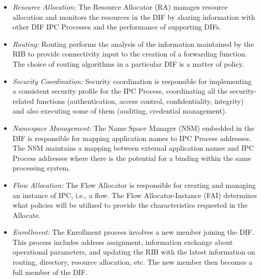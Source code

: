 \documentclass{ieeeaccess}
\begin{document}
\begin{itemize}
	\item \textit{Resource Allocation:} The Resource Allocator (RA) manages resource allocation and monitors the resources in the DIF by sharing information with other DIF IPC Processes and the performance of supporting DIFs.
	\item \textit{Routing:} Routing performs the analysis of the information maintained by the RIB to provide connectivity input to the creation of a forwarding function. The choice of routing algorithms in a particular DIF is a matter of policy.
	\item \textit{Security Coordination:} Security coordination is responsible for implementing a consistent security profile for the IPC Process, coordinating all the security-related functions (authentication, access control, confidentiality, integrity) and also executing some of them (auditing, credential management).
	\item \textit{Namespace Management:} The Name Space Manager (NSM) embedded in the DIF is responsible for mapping application names to IPC Process addresses. The NSM maintains a mapping between external application names and IPC Process addresses where there is the potential for a binding within the same processing system.
	\item \textit{Flow Allocation:} The Flow Allocator is responsible for creating and managing an instance of IPC, i.e., a flow. The Flow Allocator-Instance (FAI) determines what policies will be utilized to provide the characteristics requested in the Allocate.
	\item \textit{Enrollment:} The Enrollment process involves a new member joining the DIF. This process includes address assignment, information exchange about operational parameters, and updating the RIB with the latest information on routing, directory, resource allocation, etc. The new member then becomes a full member of the DIF.
\end{itemize}
\end{document}
